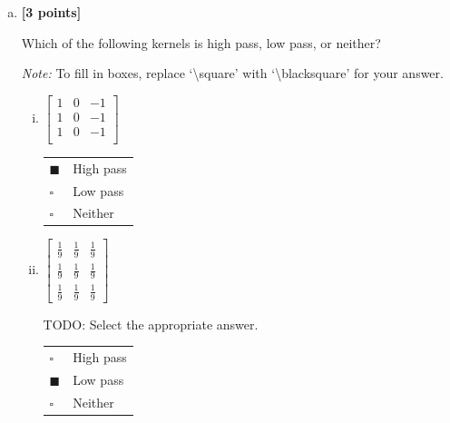 \documentclass[11pt]{article}
\begin{document}
\begin{enumerate}[(a)]
\item \textbf{[3 points]}
\begin{tcolorbox}[colback=orange!5!white,colframe=orange!75!black]
Which of the following kernels is high pass, low pass, or neither?
\end{tcolorbox}

\emph{Note:} To fill in boxes, replace `\textbackslash square' with `\textbackslash blacksquare' for your answer.

\begin{enumerate}[(i)]
\item
 $\begin{bmatrix}
    1 & 0 & -1 \\
    1 & 0 & -1 \\
    1 & 0 & -1 \\
 \end{bmatrix}$
\begin{tcolorbox}[colback=white!5!white,colframe=green!75!black]

\begin{tabular}[h]{ll}
$\blacksquare$ & High pass \\
$\square$ & Low pass \\
$\square$ & Neither \\
\end{tabular}

\end{tcolorbox}

\item
 $\begin{bmatrix}
    \frac{1}{9} & \frac{1}{9} & \frac{1}{9} \\
    \frac{1}{9} & \frac{1}{9} & \frac{1}{9} \\
    \frac{1}{9} & \frac{1}{9} & \frac{1}{9}
 \end{bmatrix}$
 \begin{tcolorbox}[colback=white!5!white,colframe=green!75!black]

TODO: Select the appropriate answer. %

\begin{tabular}[h]{ll}
$\square$ & High pass \\
$\blacksquare$ & Low pass \\
$\square$ & Neither \\
\end{tabular}


\end{tcolorbox}
\end{enumerate}
\end{enumerate}
\end{document}
